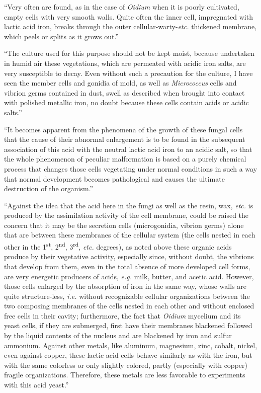 \documentclass[a4paper, 12pt, oneside]{article}
\begin{document}
``Very often are found, as in the case of \emph{Oidium} when it is poorly cultivated, empty cells with very smooth walls. Quite often the inner cell, impregnated with lactic acid iron, breaks through the outer cellular-warty-\emph{etc.} thickened membrane, which peels or splits as it grows out.''

``The culture used for this purpose should not be kept moist, because undertaken in humid air these vegetations, which are permeated with acidic iron salts, are very susceptible to decay. Even without such a precaution for the culture, I have seen the member cells and gonidia of mold, as well as \emph{Micrococcus} cells and vibrion germs contained in dust, swell as described when brought into contact with polished metallic iron, no doubt because these cells contain acids or acidic salts.''

``It becomes apparent from the phenomena of the growth of these fungal cells that the cause of their abnormal enlargement is to be found in the subsequent association of this acid with the neutral lactic acid iron to an acidic salt, so that the whole phenomenon of peculiar malformation is based on a purely chemical process that changes those cells vegetating under normal conditions in such a way that normal development becomes pathological and causes the ultimate destruction of the organism.''

``Against the idea that the acid here in the fungi as well as the resin, wax, \emph{etc.} is produced by the assimilation activity of the cell membrane, could be raised the concern that it may be the secretion cells (microgonidia, vibrion germs) alone that are between these membranes of the cellular system (the cells nested in each other in the 1\textsuperscript{st}, 2\textsuperscript{nd}, 3\textsuperscript{rd}, \emph{etc.} degrees), as noted above these organic acids produce by their vegetative activity, especially since, without doubt, the vibrions that develop from them, even in the total absence of more developed cell forms, are very energetic producers of acids, \emph{e.g.} milk, butter, and acetic acid. However, those cells enlarged by the absorption of iron in the same way, whose walls are quite structure-less, \emph{i.e.} without recognizable cellular organizations between the two composing membranes of the cells nested in each other and without enclosed free cells in their cavity; furthermore, the fact that \emph{Oidium} mycelium and its yeast cells, if they are submerged, first have their membranes blackened followed by the liquid contents of the nucleus and are blackened by iron and sulfur ammonium. Against other metals, like aluminum, magnesium, zinc, cobalt, nickel, even against copper, these lactic acid cells behave similarly as with the iron, but with the same colorless or only slightly colored, partly (especially with copper) fragile organizations. Therefore, these metals are less favorable to experiments with this acid yeast.''
\end{document}
